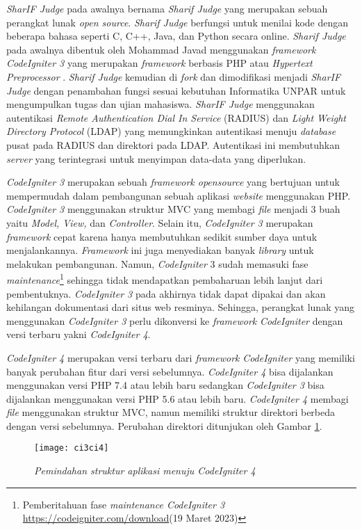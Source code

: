 \textit{SharIF Judge} pada awalnya bernama \textit{Sharif Judge} yang merupakan sebuah perangkat lunak \textit{open source}. \textit{Sharif Judge} berfungsi untuk menilai kode dengan beberapa bahasa seperti C, C++, Java, dan Python secara online. \textit{Sharif Judge} pada awalnya dibentuk oleh Mohammad Javad menggunakan \textit{framework} \textit{CodeIgniter 3} yang merupakan \textit{framework} berbasis PHP atau \textit{Hypertext Preprocessor} \cite{sharif:23}. \textit{Sharif Judge} kemudian di \textit{fork} dan dimodifikasi menjadi \textit{SharIF Judge} dengan penambahan fungsi sesuai kebutuhan Informatika UNPAR untuk mengumpulkan tugas dan ujian mahasiswa\cite{sharif:23}. \textit{SharIF Judge} menggunakan autentikasi \textit{Remote Authentication Dial In Service} (RADIUS) dan \textit{Light Weight Directory Protocol} (LDAP) yang memungkinkan autentikasi menuju \textit{database} pusat pada RADIUS dan direktori pada LDAP. Autentikasi ini membutuhkan \textit{server} yang terintegrasi untuk menyimpan data-data yang diperlukan.

\textit{CodeIgniter 3} merupakan sebuah \textit{framework opensource} yang bertujuan untuk mempermudah dalam pembangunan sebuah aplikasi \textit{website} menggunakan PHP. \textit{CodeIgniter 3} menggunakan struktur MVC yang membagi \textit{file} menjadi 3 buah yaitu \textit{Model, View,} dan \textit{Controller}. Selain itu, \textit{CodeIgniter 3} merupakan \textit{framework} cepat karena hanya membutuhkan sedikit sumber daya untuk menjalankannya. \textit{Framework} ini juga menyediakan banyak \textit{library} untuk melakukan pembangunan\cite{ci3:22}. Namun, \textit{CodeIgniter} 3 sudah memasuki fase \textit{maintenance}\footnote{Pemberitahuan fase \textit{maintenance CodeIgniter 3} \url{https://codeigniter.com/download}(19 Maret 2023)} sehingga tidak mendapatkan pembaharuan lebih lanjut dari pembentuknya. \textit{CodeIgniter 3} pada akhirnya tidak dapat dipakai dan akan kehilangan dokumentasi dari situs web resminya. Sehingga, perangkat lunak yang menggunakan \textit{CodeIgniter 3} perlu dikonversi ke \textit{framework} \textit{CodeIgniter} dengan versi terbaru yakni \textit{CodeIgniter 4}.

\textit{CodeIgniter 4} merupakan versi terbaru dari \textit{framework} \textit{CodeIgniter} yang memiliki banyak perubahan fitur dari versi sebelumnya. \textit{CodeIgniter 4} bisa dijalankan menggunakan versi PHP 7.4 atau lebih baru sedangkan \textit{CodeIgniter 3} bisa dijalankan menggunakan versi PHP 5.6 atau lebih baru. \textit{CodeIgniter 4} membagi \textit{file} menggunakan struktur MVC, namun memiliki struktur direktori berbeda dengan versi sebelumnya\cite{codeigniter:23:ci4}. Perubahan direktori ditunjukan oleh Gambar \ref{fig:dirMappingBab1}.
\begin{figure}[H]
	\centering  
	\texttt{[image: ci3ci4]}  
	\caption[\textit{Pemindahan struktur aplikasi menuju \textit{CodeIgniter 4}}]{\textit{Pemindahan struktur aplikasi menuju \textit{CodeIgniter 4}}} 
	\label{fig:dirMappingBab1} 
\end{figure}

